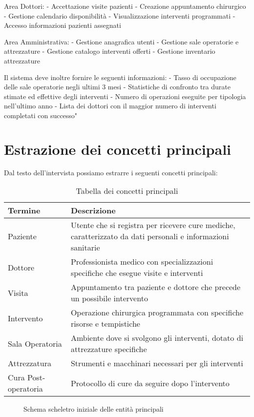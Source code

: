 \documentclass[12pt,a4paper]{report}
\begin{document}
Area Dottori:
- Accettazione visite pazienti
- Creazione appuntamento chirurgico
- Gestione calendario disponibilità
- Visualizzazione interventi programmati
- Accesso informazioni pazienti assegnati

Area Amministrativa:
- Gestione anagrafica utenti
- Gestione sale operatorie e attrezzature
- Gestione catalogo interventi offerti
- Gestione inventario attrezzature

Il sistema deve inoltre fornire le seguenti informazioni:
- Tasso di occupazione delle sale operatorie negli ultimi 3 mesi
- Statistiche di confronto tra durate stimate ed effettive degli interventi
- Numero di operazioni eseguite per tipologia nell'ultimo anno
- Lista dei dottori con il maggior numero di interventi completati con successo"

\section{Estrazione dei concetti principali}
Dal testo dell'intervista possiamo estrarre i seguenti concetti principali:

\begin{table}[H]
\caption{Tabella dei concetti principali}
\begin{tabular}{p{3cm}p{12cm}}
\toprule
\textbf{Termine} & \textbf{Descrizione} \\
\midrule
Paziente & Utente che si registra per ricevere cure mediche, caratterizzato da dati personali e informazioni sanitarie \\
Dottore & Professionista medico con specializzazioni specifiche che esegue visite e interventi \\
Visita & Appuntamento tra paziente e dottore che precede un possibile intervento \\
Intervento & Operazione chirurgica programmata con specifiche risorse e tempistiche \\
Sala Operatoria & Ambiente dove si svolgono gli interventi, dotato di attrezzature specifiche \\
Attrezzatura & Strumenti e macchinari necessari per gli interventi \\
Cura Post-operatoria & Protocollo di cure da seguire dopo l'intervento \\
\bottomrule
\end{tabular}
\end{table}

\begin{figure}[H]
\caption{Schema scheletro iniziale delle entità principali}
\centering
\end{figure}
\end{document}
